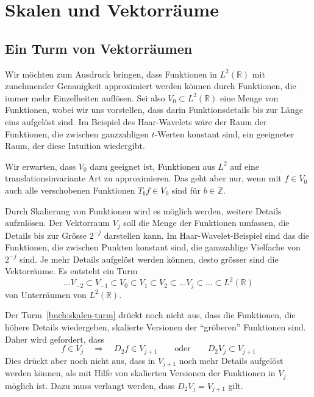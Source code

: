 %
%
%
\section{Skalen und Vektorräume
\label{section:skalen und vektorraeume}}

\subsection{Ein Turm von Vektorräumen}
Wir möchten zum Ausdruck bringen, dass Funktionen in $L^2(\mathbb R)$
mit zunehmender Genauigkeit approximiert werden können durch Funktionen,
die immer mehr Einzelheiten auflösen.
Sei also $V_0\subset L^2(\mathbb R)$ eine Menge von Funktionen, wobei wir
uns vorstellen, dass darin Funktionsdetails bis zur Länge eins aufgelöst
sind.
Im Beispiel des Haar-Wavelets wäre der Raum der Funktionen, die
zwischen ganzzahligen $t$-Werten konstant sind, ein geeigneter Raum,
der diese Intuition wiedergibt.

Wir erwarten, dass $V_0$ dazu geeignet ist, Funktionen aus $L^2$ auf
eine translationsinvariante Art zu approximieren.
Das geht aber nur, wenn mit $f\in V_0$ auch alle verschobenen Funktionen
$T_bf\in V_0$ sind für $b\in\mathbb Z$.

Durch Skalierung von Funktionen wird es möglich werden, weitere Details
aufzulösen.
Der Vektorraum $V_j$ soll die Menge der Funktionen umfassen, die Details
bis zur Grösse $2^{-j}$ darstellen kann.
Im Haar-Wavelet-Beispiel sind das die Funktionen, die zwischen Punkten
konstant sind, die ganzzahlige Vielfache von $2^{-j}$ sind.
Je mehr Details aufgelöst werden können, desto grösser sind die
Vektorräume.
Es entsteht ein Turm
\begin{equation}
\dots
V_{-2}\subset
V_{-1}\subset
V_0\subset
V_1\subset
V_2\subset
\dots
V_j\subset
\dots
\subset L^2(\mathbb R)
\label{buch:skalen-turm}
\end{equation}
von Unterräumen von $L^2(\mathbb R)$.

Der Turm~\eqref{buch:skalen-turm} drückt noch nicht aus, dass die
Funktionen, die höhere Details wiedergeben, skalierte Versionen der
``gröberen'' Funktionen sind.
Daher wird gefordert, dass
\[
f\in V_j \quad\Rightarrow\quad D_2f\in V_{j+1}
\qquad\text{oder}\qquad
D_2V_j \subset V_{j+1}
\]
Dies drückt aber noch nicht aus, dass in $V_{j+1}$ noch mehr Details
aufgelöst werden können, als mit Hilfe von skalierten Versionen der
Funktionen in $V_j$ möglich ist.
Dazu muss verlangt werden, dass
$D_2V_j = V_{j+1}$
gilt.

